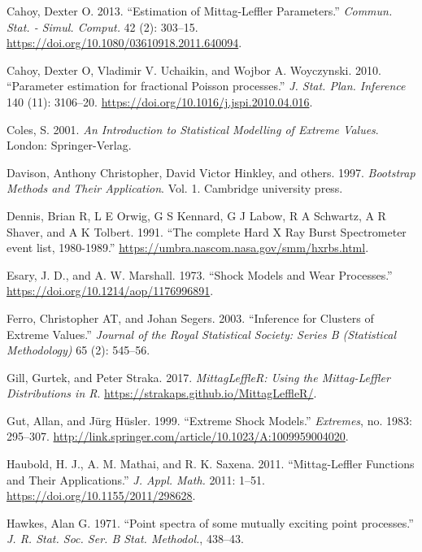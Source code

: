 \documentclass[]{elsarticle} %
\begin{document}
\leavevmode\hypertarget{ref-Cahoy2013}{}%
Cahoy, Dexter O. 2013. ``Estimation of Mittag-Leffler Parameters.''
\emph{Commun. Stat. - Simul. Comput.} 42 (2): 303--15.
\url{https://doi.org/10.1080/03610918.2011.640094}.

\leavevmode\hypertarget{ref-Cahoy2010}{}%
Cahoy, Dexter O, Vladimir V. Uchaikin, and Wojbor A. Woyczynski. 2010.
``Parameter estimation for fractional Poisson processes.'' \emph{J.
Stat. Plan. Inference} 140 (11): 3106--20.
\url{https://doi.org/10.1016/j.jspi.2010.04.016}.

\leavevmode\hypertarget{ref-ColesBook}{}%
Coles, S. 2001. \emph{An Introduction to Statistical Modelling of
Extreme Values}. London: Springer-Verlag.

\leavevmode\hypertarget{ref-davison1997bootstrap}{}%
Davison, Anthony Christopher, David Victor Hinkley, and others. 1997.
\emph{Bootstrap Methods and Their Application}. Vol. 1. Cambridge
university press.

\leavevmode\hypertarget{ref-HXRBS}{}%
Dennis, Brian R, L E Orwig, G S Kennard, G J Labow, R A Schwartz, A R
Shaver, and A K Tolbert. 1991. ``The complete Hard X Ray Burst
Spectrometer event list, 1980-1989.''
\url{https://umbra.nascom.nasa.gov/smm/hxrbs.html}.

\leavevmode\hypertarget{ref-Esary1973}{}%
Esary, J. D., and A. W. Marshall. 1973. ``Shock Models and Wear
Processes.'' \url{https://doi.org/10.1214/aop/1176996891}.

\leavevmode\hypertarget{ref-ferro2003inference}{}%
Ferro, Christopher AT, and Johan Segers. 2003. ``Inference for Clusters
of Extreme Values.'' \emph{Journal of the Royal Statistical Society:
Series B (Statistical Methodology)} 65 (2): 545--56.

\leavevmode\hypertarget{ref-MittagLeffleR}{}%
Gill, Gurtek, and Peter Straka. 2017. \emph{MittagLeffleR: Using the
Mittag-Leffler Distributions in R}.
\url{https://strakaps.github.io/MittagLeffleR/}.

\leavevmode\hypertarget{ref-Gut1999}{}%
Gut, Allan, and Jürg Hüsler. 1999. ``Extreme Shock Models.''
\emph{Extremes}, no. 1983: 295--307.
\url{http://link.springer.com/article/10.1023/A:1009959004020}.

\leavevmode\hypertarget{ref-Haubold11}{}%
Haubold, H. J., A. M. Mathai, and R. K. Saxena. 2011. ``Mittag-Leffler
Functions and Their Applications.'' \emph{J. Appl. Math.} 2011: 1--51.
\url{https://doi.org/10.1155/2011/298628}.

\leavevmode\hypertarget{ref-hawkes1971point}{}%
Hawkes, Alan G. 1971. ``Point spectra of some mutually exciting point
processes.'' \emph{J. R. Stat. Soc. Ser. B Stat. Methodol.}, 438--43.
\end{document}
